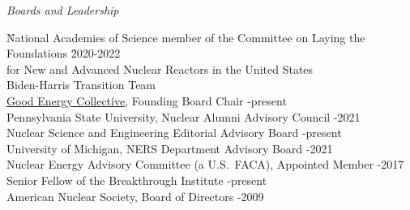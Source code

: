 \vspace*{-.25em}
\textit{Boards and Leadership}
\vspace*{-.4em}
\begin{tabbing}
\hspace*{1 em}\= National Academies of Science member of the Committee on Laying the
Foundations \hspace*{0.5em} \= 2020-2022\\
\> \hspace*{1em} for New and Advanced Nuclear Reactors in the United States\\
\> Biden-Harris Transition Team \\
%
\> \href{https://www.goodenergycollective.org/}{Good Energy Collective}, Founding Board Chair -present\\
%
\> Pennsylvania State University, Nuclear Alumni Advisory Council -2021\\
%
\> Nuclear Science and Engineering Editorial Advisory Board -present\\
%
\> University of Michigan, NERS Department Advisory Board -2021\\
%
%
\> Nuclear Energy Advisory Committee (a U.S.\ FACA), Appointed Member -2017 \\
%
%
\> Senior Fellow of the Breakthrough Institute -present\\
%
\> American  Nuclear Society, Board of Directors -2009
\end{tabbing}

